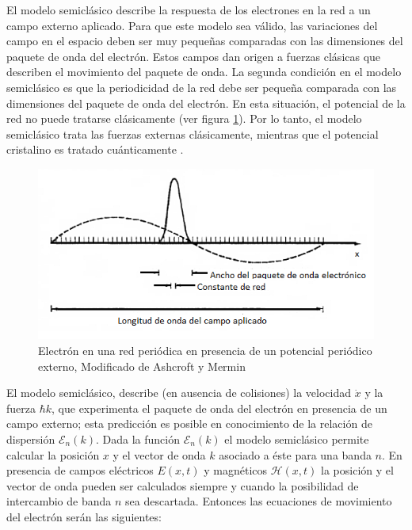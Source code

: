 El modelo semiclásico describe la respuesta de los electrones en la red a un campo externo aplicado. Para que este modelo sea válido, las variaciones del campo en el espacio deben ser muy pequeñas comparadas con las dimensiones del paquete de onda del electrón. Estos campos dan origen a fuerzas clásicas que describen el movimiento del paquete de onda. La segunda condición en el modelo semiclásico es que la periodicidad de la red debe ser pequeña comparada con las dimensiones del paquete de onda del electrón. En esta situación, el potencial de la red no puede tratarse clásicamente (ver figura \ref{fig:7.1}). Por lo tanto, el modelo semiclásico trata las fuerzas externas clásicamente, mientras que el potencial cristalino es tratado cuánticamente \cite{ashc}.

\begin{figure}[H]
    \centering
    \includegraphics[scale=.9]{imagenes/dinamica-semiclasica.png}
    \caption{Electrón en una red periódica en presencia de un potencial periódico externo, Modificado de Ashcroft y Mermin \cite{ashc} }
    \label{fig:7.1}
\end{figure}

El modelo semiclásico, describe (en ausencia de colisiones) la velocidad $\dot{x}$ y la fuerza $\hbar k$, que experimenta el paquete de onda del electrón en presencia de un campo externo; esta predicción es posible en conocimiento de la relación de dispersión $\mathcal{E}_n(k)$. Dada la función $\mathcal{E}_n(k)$ el modelo semiclásico permite calcular la posición $x$ y el vector de onda $k$ asociado a éste para una banda $n$. En presencia de campos eléctricos $E(x,t)$ y magnéticos $\mathcal{H}(x,t)$ la posición y el vector de onda pueden ser calculados siempre y cuando la posibilidad de intercambio de banda $n$ sea descartada. Entonces las ecuaciones de movimiento del electrón serán las siguientes:


